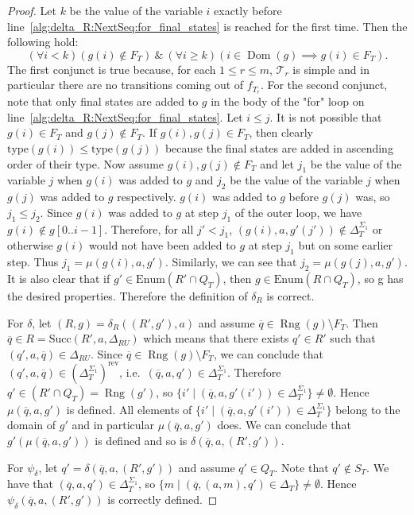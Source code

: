 \documentclass{article}
\DeclareMathOperator{\Dom}{Dom}
\DeclareMathOperator{\Rng}{Rng}
\begin{document}
\begin{proof}
		Let $k$ be the value of the variable $i$ exactly before line~\ref{alg:delta_R:NextSeq:for_final_states} is reached for the first time. Then the following hold:
		\[
			(\forall i < k)(g(i)\notin F_T)\ \&\ 
			(\forall i\ge k)(i\in\Dom(g)\implies g(i)\in F_T).
		\]
		The first conjunct is true because, for each $1\le r\le m$, $\mathcal{T}_r$ is simple and in particular there are no transitions coming out of $f_{T_r}$. For the second conjunct, note that only final states are added to $g$ in the body of the "for" loop on line~\ref{alg:delta_R:NextSeq:for_final_states}.
		Let $i\le j$. It is not possible that $g(i)\in F_T$ and $g(j)\notin F_T$.
		If $g(i), g(j)\in F_T$, then clearly $\mathrm{type}(g(i))\le \mathrm{type}(g(j))$ because the final states are added in ascending order of their type.
		Now assume $g(i), g(j)\notin F_T$ and let $j_1$ be the value of the variable $j$ when $g(i)$ was added to $g$ and $j_2$ be the value of the variable $j$ when $g(j)$ was added to $g$ respectively. $g(i)$ was added to $g$ before $g(j)$ was, so $j_1\le j_2$.
		Since $g(i)$ was added to $g$ at step $j_1$ of the outer loop, we have $g(i)\notin g[0..i-1]$.
		Therefore, for all $j' < j_1$, $(g(i), a, g'(j'))\notin \Delta_T^{\Sigma_1}$ or otherwise $g(i)$ would not have been added to $g$ at step $j_1$ but on some earlier step. Thus $j_1 = \mu(g(i), a, g')$. Similarly, we can see that $j_2 = \mu(g(j), a, g')$.
		It is also clear that if $g'\in \mathrm{Enum}(R'\cap Q_T)$, then $g\in \mathrm{Enum}(R\cap Q_T)$, so g has the desired properties. Therefore the definition of $\delta_R$ is correct.
\fi

		For $\delta$, let $(R, g) = \delta_R((R', g'), a)$ and assume $\overline{q}\in \Rng(g)\setminus F_T$.
		Then $\overline{q}\in R = \mathrm{Succ}(R', a, \Delta_{RU})$ which means that there exists $q'\in R'$ such that $(q', a, \overline{q})\in \Delta_{RU}$.
		Since $\overline{q}\in \Rng(g)\setminus F_T$, we can conclude that $(q', a, \overline{q})\in {\left(\Delta_T^{\Sigma_1}\right)}^\mathrm{rev}$, i.e.\ $(\overline{q}, a, q')\in \Delta_T^{\Sigma_1}$.
		Therefore $q'\in (R'\cap Q_T) = \Rng(g')$, so $\{ i' \mid (\overline{q}, a, g'(i'))\in \Delta_T^{\Sigma_1} \}\ne \emptyset$.
		Hence $\mu(\overline{q}, a, g')$ is defined.
		All elements of $\{ i' \mid (\overline{q}, a, g'(i'))\in \Delta_T^{\Sigma_1} \}$ belong to the domain of $g'$ and in particular $\mu(\overline{q}, a, g')$ does.
		We can conclude that $g'(\mu(\overline{q}, a, g'))$ is defined and so is $\delta(\overline{q}, a, (R', g'))$.
		
		For $\psi_\delta$, let $q' = \delta(\overline{q}, a, (R', g'))$ and assume $q'\in Q_T$. Note that $q'\notin S_T$.
		We have that $(\overline{q}, a, q')\in \Delta_T^{\Sigma_1}$, so $\{ m \mid (\overline{q}, (a, m), q')\in \Delta_T \}\ne \emptyset$.
		Hence $\psi_\delta(\overline{q}, a, (R', g'))$ is correctly defined.
	\end{proof}
\end{document}

